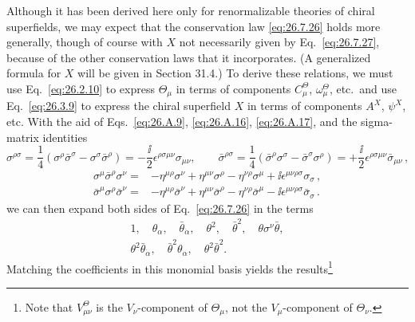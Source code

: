 Although it has been derived here only for renormalizable theories of chiral
superfields, we may expect that the conservation law \eqref{eq:26.7.26}
holds more generally, though of course with \(X\) not necessarily given by
Eq.~\eqref{eq:26.7.27}, because of the other conservation laws that it
incorporates. (A generalized formula for \(X\) will be given in Section
31.4.) To derive these relations, we must use Eq.~\eqref{eq:26.2.10} to
express \(\Theta_\mu\) in terms of components \(C_\mu^\Theta\),
\(\omega_\mu^\Theta\), etc.\ and use Eq.~\eqref{eq:26.3.9} to express the
chiral superfield \(X\) in terms of components \(A^X\), \(\psi^X\), etc.
With the aid of Eqs.~\eqref{eq:26.A.9}, \eqref{eq:26.A.16},
\eqref{eq:26.A.17}, and the sigma-matrix identities
\begin{equation}
  \sigma^{\rho\sigma}
  =\frac14(\sigma^\rho\bar\sigma^\sigma
            -\sigma^\sigma\bar\sigma^\rho)
  =-\frac{\ii}{2}\epsilon^{\rho\sigma\mu\nu}\sigma_{\mu\nu},
  \qquad
  \bar\sigma^{\rho\sigma}
  =\frac14(\bar\sigma^\rho\sigma^\sigma
            -\bar\sigma^\sigma\sigma^\rho)
  =+\frac{\ii}{2}\epsilon^{\rho\sigma\mu\nu}\bar\sigma_{\mu\nu}\,,
  \tag{26.7.28}\label{eq:26.7.28}
\end{equation}
\begin{equation}
  \begin{aligned}
  \sigma^\mu\bar\sigma^\rho\sigma^\nu
  ={}&-\eta^{\mu\rho}\sigma^\nu
      +\eta^{\mu\nu}\sigma^\rho
      -\eta^{\nu\rho}\sigma^\mu
      +\ii\epsilon^{\mu\nu\rho\sigma}\sigma_\sigma\,,
  \\
  \bar\sigma^\mu\sigma^\rho\bar\sigma^\nu
  ={}&-\eta^{\mu\rho}\bar\sigma^\nu
      +\eta^{\mu\nu}\bar\sigma^\rho
      -\eta^{\nu\rho}\bar\sigma^\mu
      -\ii\epsilon^{\mu\nu\rho\sigma}\bar\sigma_\sigma\,.
  \end{aligned}
  \tag{26.7.29}\label{eq:26.7.29}
\end{equation}
we can then expand both sides of Eq.~\eqref{eq:26.7.26} in the terms
\[
  \begin{gathered}
  1,\quad \theta_\alpha,\quad\bar\theta_{\dot\alpha},\quad
  \theta^2,\quad\bar\theta^2,\quad
  \theta\sigma^\nu\bar\theta,\\
  \theta^2\bar\theta_{\dot\alpha},\quad
  \bar\theta^2\theta_\alpha,\quad
  \theta^2\bar\theta^2 .
  \end{gathered}
\]
Matching the coefficients in this monomial basis yields the
results\footnote{Note that \(V_{\mu\nu}^\Theta\) is the
\(V_\nu\)-component of \(\Theta_\mu\), not the \(V_\mu\)-component of
\(\Theta_\nu\).}
